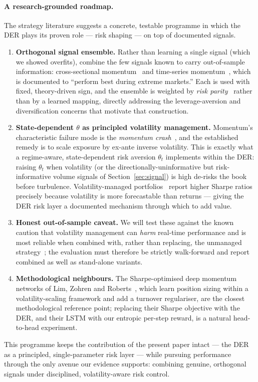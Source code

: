 \documentclass[11pt]{article}
\theoremstyle{definition}
\begin{document}
\paragraph{A research-grounded roadmap.} The strategy literature suggests a concrete,
testable programme in which the DER plays its proven role --- risk shaping --- on top
of documented signals.
\begin{enumerate}
\item \textbf{Orthogonal signal ensemble.} Rather than learning a single signal (which
we showed overfits), combine the few signals known to carry out-of-sample information:
cross-sectional momentum~\cite{jegadeesh1993} and time-series
momentum~\cite{moskowitz2012}, which is documented to ``perform best during extreme
markets.'' Each is used with fixed, theory-driven sign, and the ensemble is weighted
by \emph{risk parity}~\cite{asness2012} rather than by a learned mapping, directly
addressing the leverage-aversion and diversification concerns that motivate that
construction.
\item \textbf{State-dependent $\theta$ as principled volatility management.} Momentum's
characteristic failure mode is the \emph{momentum crash}~\cite{daniel2016}, and the
established remedy is to scale exposure by ex-ante inverse volatility. This is exactly
what a regime-aware, state-dependent risk aversion $\theta_t$ implements within the DER:
raising $\theta_t$ when volatility (or the directionally-uninformative but
risk-informative volume signals of Section~\ref{sec:signal}) is high de-risks the book
before turbulence. Volatility-managed portfolios~\cite{moreira2017} report higher
Sharpe ratios precisely because volatility is more forecastable than returns ---
giving the DER risk layer a documented mechanism through which to add value.
\item \textbf{Honest out-of-sample caveat.} We will test these against the known
caution that volatility management can \emph{harm} real-time performance and is most
reliable when combined with, rather than replacing, the unmanaged
strategy~\cite{moreira2017}; the evaluation must therefore be strictly walk-forward and
report combined as well as stand-alone variants.
\item \textbf{Methodological neighbours.} The Sharpe-optimised deep momentum networks
of Lim, Zohren and Roberts~\cite{lim2019}, which learn position sizing within a
volatility-scaling framework and add a turnover regulariser, are the closest
methodological reference point; replacing their Sharpe objective with the DER, and
their LSTM with our entropic per-step reward, is a natural head-to-head experiment.
\end{enumerate}
This programme keeps the contribution of the present paper intact --- the DER as a
principled, single-parameter risk layer --- while pursuing performance through the only
avenue our evidence supports: combining genuine, orthogonal signals under disciplined,
volatility-aware risk control.
\end{document}
